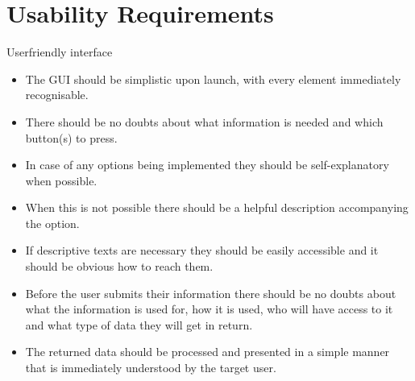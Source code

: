 \section{Usability Requirements}

\begin{requirement}{Userfriendly interface}
\begin{itemize}
  \item The \ac{GUI} should be simplistic upon launch, with every element immediately recognisable.
  \item There should be no doubts about what information is needed and which button(s) to press.
  \item In case of any options being implemented they should be self-explanatory when possible.
  \item When this is not possible there should be a helpful description accompanying the option.
  \item If descriptive texts are necessary they should be easily accessible and it should be obvious how to reach them.
  \item Before the user submits their information there should be no doubts about what the information is used for, how
        it is used, who will have access to it and what type of data they will get in return.
  \item The returned data should be processed and presented in a simple manner that is immediately understood by the
        target user.
\end{itemize}
\end{requirement}